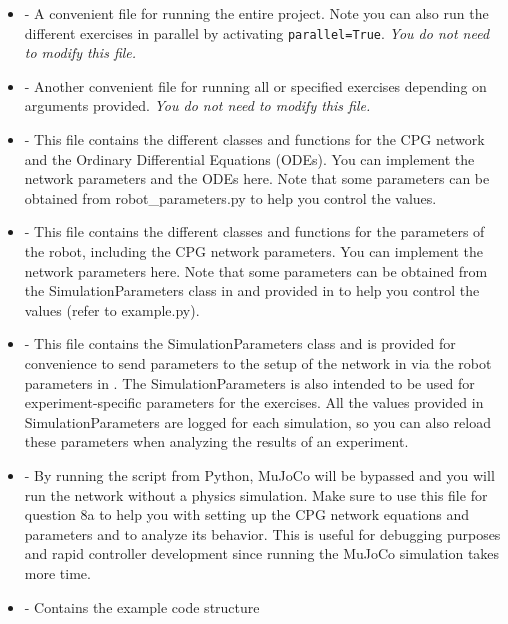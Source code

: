\documentclass{cmc}
\begin{document}
\begin{itemize}
\item {} - A convenient file for running the entire
  project. Note you can also run the different exercises in parallel by
  activating \texttt{parallel=True}. \textit{You do not need to modify this
    file.}
\item {} - Another convenient file for running all
  or specified exercises depending on arguments provided. \textit{You do not
    need to modify this file.}
\item {} - This file contains the different classes and
  functions for the CPG network and the Ordinary Differential Equations
  (ODEs). You can implement the network parameters and the ODEs here. Note that
  some parameters can be obtained from robot\_parameters.py to help you control
  the values.
\item {} - This file contains the different
  classes and functions for the parameters of the robot, including the CPG
  network parameters. You can implement the network parameters here. Note that
  some parameters can be obtained from the SimulationParameters class in
   and provided in  to
  help you control the values (refer to example.py).
\item {} - This file contains the
  SimulationParameters class and is provided for convenience to send parameters
  to the setup of the network in  via the
  robot parameters in . The
  SimulationParameters is also intended to be used for experiment-specific
  parameters for the exercises. All the values provided in SimulationParameters
  are logged for each simulation, so you can also reload these parameters when
  analyzing the results of an experiment.
\item {} - By running the script from Python,
  MuJoCo will be bypassed and you will run the network without a physics
  simulation. Make sure to use this file for question 8a to help you with
  setting up the CPG network equations and parameters and to analyze its
  behavior. This is useful for debugging purposes and rapid controller
  development since running the MuJoCo simulation takes more time.
\item {} - Contains the example code structure

\end{itemize}
\end{document}
